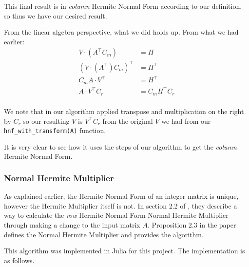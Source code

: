 \documentclass[oneside, a4paper, onecolumn, 11pt]{article}
\begin{document}
This final result is in \textit{column} Hermite Normal Form according to our definition, so thus we have our desired result.

From the linear algebra perspective, what we did holds up. From what we had earlier:
\begin{align*}
    V \cdot (A^\intercal C_m)             & = H                   \\
    (V \cdot (A^\intercal) C_m)^\intercal & = H^\intercal         \\
    C_m A \cdot V^\intercal               & = H^\intercal         \\
    A \cdot V^\intercal C_r               & = C_m H^\intercal C_r \\
\end{align*}

We note that in our algorithm applied transpose and multiplication on the right by \(C_r\) so our resulting \(V\) is \(V^\intercal C_r\) from the original \(V\) we had from our \texttt{hnf\_with\_transform(A)} function.

It is very clear to see how it uses the steps of our algorithm to get the \textit{column} Hermite Normal Form.

\subsubsection{Normal Hermite Multiplier}

As explained earlier, the Hermite Normal Form of an integer matrix is unique, however the Hermite Multiplier itself is not. In section 2.2 of \cite{Hubert2013}, they describe a way to calculate the \textit{row} Hermite Normal Form Normal Hermite Multiplier through making a change to the input matrix \(A\). Proposition 2.3 in the paper defines the Normal Hermite Multiplier and provides the algorithm.

This algorithm was implemented in Julia for this project. The implementation is as follows.

\hfill\break
\end{document}
